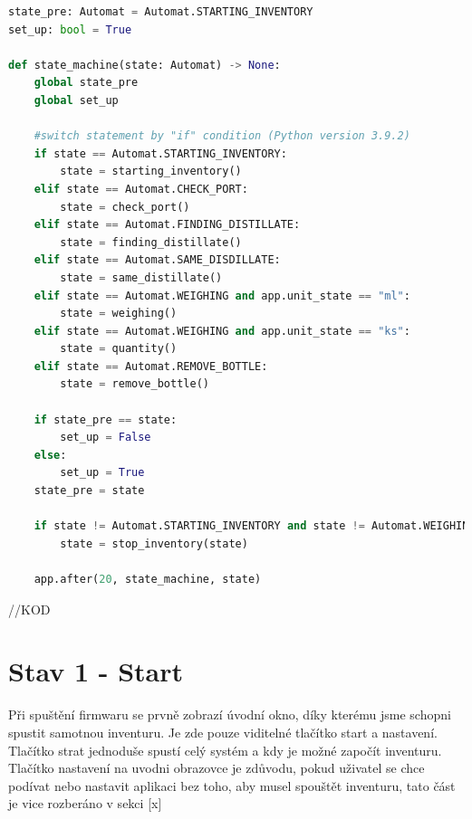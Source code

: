 



\begin{lstlisting}[language=Python, caption=Funkce stavového automatu:, frame=single, breaklines=true, postbreak=\mbox{\textcolor{gray}{$\hookrightarrow$}\space}]
state_pre: Automat = Automat.STARTING_INVENTORY
set_up: bool = True

def state_machine(state: Automat) -> None:
    global state_pre
    global set_up
    
    #switch statement by "if" condition (Python version 3.9.2)
    if state == Automat.STARTING_INVENTORY:
        state = starting_inventory()
    elif state == Automat.CHECK_PORT:
        state = check_port()
    elif state == Automat.FINDING_DISTILLATE:
        state = finding_distillate()
    elif state == Automat.SAME_DISDILLATE:
        state = same_distillate()
    elif state == Automat.WEIGHING and app.unit_state == "ml":
        state = weighing()
    elif state == Automat.WEIGHING and app.unit_state == "ks":
        state = quantity()
    elif state == Automat.REMOVE_BOTTLE:
        state = remove_bottle()

    if state_pre == state:
        set_up = False
    else:
        set_up = True
    state_pre = state
    
    if state != Automat.STARTING_INVENTORY and state != Automat.WEIGHING and app.button_stop_pressed:
        state = stop_inventory(state)

    app.after(20, state_machine, state)
\end{lstlisting}



//KOD

\section{Stav 1 - Start}
Při spuštění firmwaru se prvně zobrazí úvodní okno, díky kterému jsme schopni spustit samotnou inventuru. Je zde pouze viditelné tlačítko start a nastavení. Tlačítko strat jednoduše spustí celý systém a kdy je možné započít inventuru. Tlačítko nastavení na uvodni obrazovce je zdůvodu, pokud uživatel se chce podívat nebo nastavit aplikaci bez toho, aby musel spouštět inventuru, tato část je vice rozberáno v sekci [x]

